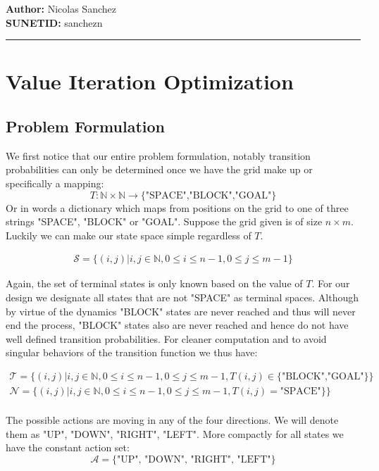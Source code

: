 \documentclass{article}[12pt]
\newcommand{\headings}[4]{\noindent {\bf Midterm CME241} \hfill {{\bf Author:} Nicolas Sanchez} \\
{} \hfill {{\bf SUNETID:} sanchezn} \\

\rule[0.1in]{\textwidth}{0.025in}
}
\begin{document}
\headings{\#1}{Tuesday, October 8, 10:30am}\section{} 



\section{Value Iteration Optimization}
\subsection{Problem Formulation}
We first notice that our entire problem formulation, notably transition probabilities can only be determined once we have the grid make up or specifically a mapping: $$T:\mathbb{N} \times \mathbb{N} \to \{\text{"SPACE","BLOCK","GOAL"}\}$$ Or in words a dictionary which maps from positions on the grid to one of three strings "SPACE", "BLOCK" or "GOAL". Suppose the grid given is of size $n\times m$. Luckily we can make our state space simple regardless of $T$.

\begin{align*}
\mathcal{S} = \{ (i,j) | i,j \in \mathbb{N}, 0\leq i \leq n-1, 0\leq j \leq m-1\}
\end{align*}

Again, the set of terminal states is only known based on the value of $T$. For our design we designate all states that are not "SPACE" as terminal spaces. Although by virtue of the dynamics "BLOCK" states are never reached and thus will never end the process, "BLOCK" states also are never reached and hence do not have well defined transition probabilities. For cleaner computation and to avoid singular behaviors of the transition function we thus have:

\begin{align*}
\mathcal{T} = \{ (i,j) | i,j \in \mathbb{N}, 0\leq i \leq n-1, 0\leq j \leq m-1,T(i,j)\in\{\text{"BLOCK","GOAL"}\}\}\\
\mathcal{N} = \{ (i,j) | i,j \in \mathbb{N}, 0\leq i \leq n-1, 0\leq j \leq m-1,T(i,j) = \text{"SPACE"}\}\}\\
\end{align*}

The possible actions are moving in any of the four directions. We will denote them as "UP", "DOWN", "RIGHT", "LEFT". More compactly for all states we have the constant action set:
$$\mathcal{A} = \{\text{"UP", "DOWN", "RIGHT", "LEFT"\}}$$
\end{document}
